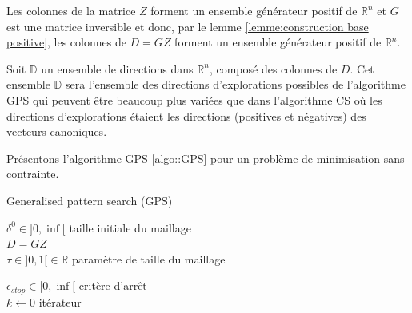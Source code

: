 \documentclass[french]{report}
\newcommand{\D}{\mathbb{D}}
\begin{document}
Les colonnes de la matrice $Z$ forment un ensemble générateur positif de $\mathbb{R}^n$ et $G$ est une matrice inversible et donc, par le lemme \ref{lemme:construction base positive}, les colonnes de $D=GZ$ forment un ensemble générateur positif de $\mathbb{R}^n$.

Soit $\D$ un ensemble de directions dans $\mathbb{R}^n$, composé des colonnes de $D$. Cet ensemble $\D$ sera l'ensemble des directions d'explorations possibles de l'algorithme GPS qui peuvent être beaucoup plus variées que dans l'algorithme CS où les directions d'explorations étaient les directions (positives et négatives) des vecteurs canoniques.

Présentons l'algorithme  GPS \ref{algo::GPS} pour un problème de minimisation sans contrainte.

\begin{algorithm}[htbp]

    \SetAlgoNoLine
    \caption{Generalised pattern search (GPS)}


    \Indp
    $\delta^0 \in ] 0,\inf [$ \hspace{40pt} taille initiale du maillage \\
            $D=GZ$ \\
            $\tau \in ]0,1[ \in \mathbb{R}$ \hspace{35pt} paramètre de taille du maillage

    $\epsilon_{stop} \in [ 0,\inf [$ \hspace{28pt} critère d'arrêt \\
    $k \leftarrow 0$ \hspace{61pt} itérateur \\
    \Indm


    \Indp
    \Indm
    \label{algo::GPS}
\end{algorithm}
\end{document}

